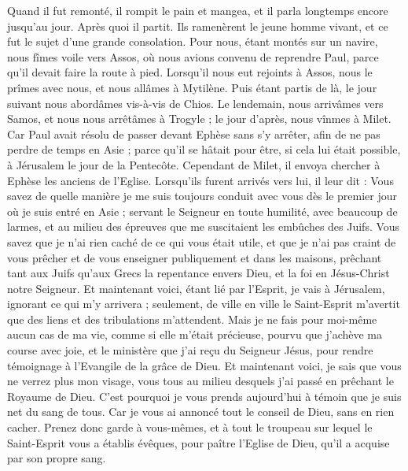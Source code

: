 \begin{multicols}{2}
Quand il fut remonté, il rompit le pain et mangea, et il parla longtemps encore jusqu'au jour. Après quoi il partit.
Ils ramenèrent le jeune homme vivant, et ce fut le sujet d’une grande consolation.
Pour nous, étant montés sur un navire, nous fîmes voile vers Assos, où nous avions convenu de reprendre Paul, parce qu’il devait faire la route à pied.
Lorsqu’il nous eut rejoints à Assos, nous le prîmes avec nous, et nous allâmes à Mytilène.
Puis étant partis de là, le jour suivant nous abordâmes vis-à-vis de Chios. Le lendemain, nous arrivâmes vers Samos, et nous nous arrêtâmes à Trogyle ; le jour d’après, nous vînmes à Milet.
Car Paul avait résolu de passer devant Ephèse sans s’y arrêter, afin de ne pas perdre de temps en Asie ; parce qu'il se hâtait pour être, si cela lui était possible, à Jérusalem le jour de la Pentecôte.
Cependant de Milet, il envoya chercher à Ephèse les anciens de l'Eglise.
Lorsqu’ils furent arrivés vers lui, il leur dit : Vous savez de quelle manière je me suis toujours conduit avec vous dès le premier jour où je suis entré en Asie ;
servant le Seigneur en toute humilité, avec beaucoup de larmes, et au milieu des épreuves que me suscitaient les embûches des Juifs.
Vous savez que je n’ai rien caché de ce qui vous était utile, et que je n’ai pas craint de vous prêcher et de vous enseigner publiquement et dans les maisons,
prêchant tant aux Juifs qu’aux Grecs la repentance envers Dieu, et la foi en Jésus-Christ notre Seigneur.
Et maintenant voici, étant lié par l'Esprit, je vais à Jérusalem, ignorant ce qui m’y arrivera ;
seulement, de ville en ville le Saint-Esprit m'avertit que des liens et des tribulations m'attendent.
Mais je ne fais pour moi-même aucun cas de ma vie, comme si elle m’était précieuse, pourvu que j'achève ma course avec joie, et le ministère que j'ai reçu du Seigneur Jésus, pour rendre témoignage à l'Evangile de la grâce de Dieu.
Et maintenant voici, je sais que vous ne verrez plus mon visage, vous tous au milieu desquels j’ai passé en prêchant le Royaume de Dieu.
C'est pourquoi je vous prends aujourd'hui à témoin que je suis net du sang de tous.
Car je vous ai annoncé tout le conseil de Dieu, sans en rien cacher.
Prenez donc garde à vous-mêmes, et à tout le troupeau sur lequel le Saint-Esprit vous a établis évêques, pour paître l'Eglise de Dieu, qu’il a acquise par son propre sang.

\end{multicols}
